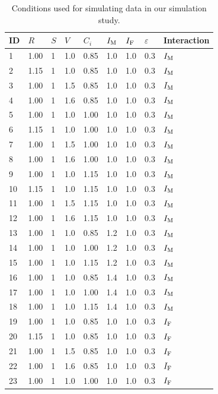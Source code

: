 
\begin{longtable}[t]{lllllllll}
\caption{\label{tab:conditions}Conditions used for simulating data in our simulation study.}\\
\toprule
ID & $R$ & $S$ & $V$ & $C_i$ & $I_{{\rm M}}$ & $I_{{\rm F}}$ & $\varepsilon$ & Interaction\\
\midrule
1 & 1.00 & 1 & 1.0 & 0.85 & 1.0 & 1.0 & 0.3 & $I_{{\rm M}}$\\
2 & 1.15 & 1 & 1.0 & 0.85 & 1.0 & 1.0 & 0.3 & $I_{{\rm M}}$\\
3 & 1.00 & 1 & 1.5 & 0.85 & 1.0 & 1.0 & 0.3 & $I_{{\rm M}}$\\
4 & 1.00 & 1 & 1.6 & 0.85 & 1.0 & 1.0 & 0.3 & $I_{{\rm M}}$\\
5 & 1.00 & 1 & 1.0 & 1.00 & 1.0 & 1.0 & 0.3 & $I_{{\rm M}}$\\
6 & 1.15 & 1 & 1.0 & 1.00 & 1.0 & 1.0 & 0.3 & $I_{{\rm M}}$\\
7 & 1.00 & 1 & 1.5 & 1.00 & 1.0 & 1.0 & 0.3 & $I_{{\rm M}}$\\
8 & 1.00 & 1 & 1.6 & 1.00 & 1.0 & 1.0 & 0.3 & $I_{{\rm M}}$\\
9 & 1.00 & 1 & 1.0 & 1.15 & 1.0 & 1.0 & 0.3 & $I_{{\rm M}}$\\
10 & 1.15 & 1 & 1.0 & 1.15 & 1.0 & 1.0 & 0.3 & $I_{{\rm M}}$\\
11 & 1.00 & 1 & 1.5 & 1.15 & 1.0 & 1.0 & 0.3 & $I_{{\rm M}}$\\
12 & 1.00 & 1 & 1.6 & 1.15 & 1.0 & 1.0 & 0.3 & $I_{{\rm M}}$\\
13 & 1.00 & 1 & 1.0 & 0.85 & 1.2 & 1.0 & 0.3 & $I_{{\rm M}}$\\
14 & 1.00 & 1 & 1.0 & 1.00 & 1.2 & 1.0 & 0.3 & $I_{{\rm M}}$\\
15 & 1.00 & 1 & 1.0 & 1.15 & 1.2 & 1.0 & 0.3 & $I_{{\rm M}}$\\
16 & 1.00 & 1 & 1.0 & 0.85 & 1.4 & 1.0 & 0.3 & $I_{{\rm M}}$\\
17 & 1.00 & 1 & 1.0 & 1.00 & 1.4 & 1.0 & 0.3 & $I_{{\rm M}}$\\
18 & 1.00 & 1 & 1.0 & 1.15 & 1.4 & 1.0 & 0.3 & $I_{{\rm M}}$\\
19 & 1.00 & 1 & 1.0 & 0.85 & 1.0 & 1.0 & 0.3 & $I_{{\rm F}}$\\
20 & 1.15 & 1 & 1.0 & 0.85 & 1.0 & 1.0 & 0.3 & $I_{{\rm F}}$\\
21 & 1.00 & 1 & 1.5 & 0.85 & 1.0 & 1.0 & 0.3 & $I_{{\rm F}}$\\
22 & 1.00 & 1 & 1.6 & 0.85 & 1.0 & 1.0 & 0.3 & $I_{{\rm F}}$\\
23 & 1.00 & 1 & 1.0 & 1.00 & 1.0 & 1.0 & 0.3 & $I_{{\rm F}}$\\

\end{longtable}
